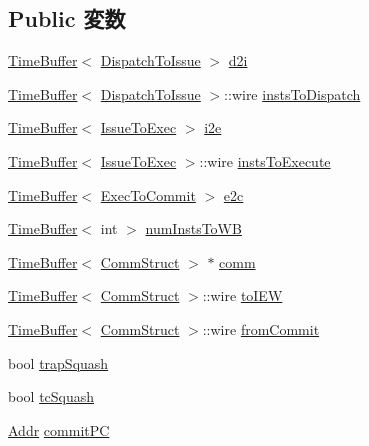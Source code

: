 \subsection*{Public 変数}
\begin{DoxyCompactItemize}
\item 
\hyperlink{classTimeBuffer}{TimeBuffer}$<$ \hyperlink{structLWBackEnd_1_1SizeStruct}{DispatchToIssue} $>$ \hyperlink{classLWBackEnd_ae446eaddd47d5f227ed00af24aaefe68}{d2i}
\item 
\hyperlink{classTimeBuffer}{TimeBuffer}$<$ \hyperlink{structLWBackEnd_1_1SizeStruct}{DispatchToIssue} $>$::wire \hyperlink{classLWBackEnd_ace1cd34be1eca99cb8c1d3a30e32fcbe}{instsToDispatch}
\item 
\hyperlink{classTimeBuffer}{TimeBuffer}$<$ \hyperlink{structLWBackEnd_1_1SizeStruct}{IssueToExec} $>$ \hyperlink{classLWBackEnd_a055203b013ada25d70a2a2c8b2364455}{i2e}
\item 
\hyperlink{classTimeBuffer}{TimeBuffer}$<$ \hyperlink{structLWBackEnd_1_1SizeStruct}{IssueToExec} $>$::wire \hyperlink{classLWBackEnd_a45c3ddf2275eab2326190578f1fcbee2}{instsToExecute}
\item 
\hyperlink{classTimeBuffer}{TimeBuffer}$<$ \hyperlink{structLWBackEnd_1_1SizeStruct}{ExecToCommit} $>$ \hyperlink{classLWBackEnd_a114248f83077c8e99f4f4aa0236aafeb}{e2c}
\item 
\hyperlink{classTimeBuffer}{TimeBuffer}$<$ int $>$ \hyperlink{classLWBackEnd_a34cd6ffaeb59e3f95f2cc2aaf8eb7ecf}{numInstsToWB}
\item 
\hyperlink{classTimeBuffer}{TimeBuffer}$<$ \hyperlink{classLWBackEnd_abdf3026ccc30c2ed3cb77dbe3cfbacad}{CommStruct} $>$ $\ast$ \hyperlink{classLWBackEnd_a282f2307a986f183b83e887756561687}{comm}
\item 
\hyperlink{classTimeBuffer}{TimeBuffer}$<$ \hyperlink{classLWBackEnd_abdf3026ccc30c2ed3cb77dbe3cfbacad}{CommStruct} $>$::wire \hyperlink{classLWBackEnd_acf56450a952ce19a7cc68c86f0334c0c}{toIEW}
\item 
\hyperlink{classTimeBuffer}{TimeBuffer}$<$ \hyperlink{classLWBackEnd_abdf3026ccc30c2ed3cb77dbe3cfbacad}{CommStruct} $>$::wire \hyperlink{classLWBackEnd_a77bf6c956edddf1d551d5371ff72162e}{fromCommit}
\item 
bool \hyperlink{classLWBackEnd_a9fe09e5855dab23839c125d21e03c644}{trapSquash}
\item 
bool \hyperlink{classLWBackEnd_ae3369c2288f4867553aaca811229bd3c}{tcSquash}
\item 
\hyperlink{base_2types_8hh_af1bb03d6a4ee096394a6749f0a169232}{Addr} \hyperlink{classLWBackEnd_af043d6103c5f173871f527899c41d2d2}{commitPC}

\end{DoxyCompactItemize}
